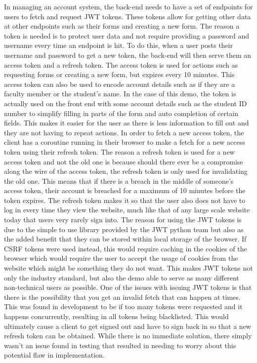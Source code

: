 In managing an account system, the back-end needs to have a set of endpoints for users to fetch and request JWT tokens. These tokens allow for getting other data at other endpoints such as their forms and creating a new form. The reason a token is needed is to protect user data and not require providing a password and username every time an endpoint is hit. To do this, when a user posts their username and password to get a new token, the back-end will then serve them an access token and a refresh token.
\newline
\newline
The access token is used for actions such as requesting forms or creating a new form, but expires every 10 minutes. This access token can also be used to encode account details such as if they are a faculty member or the student’s name. In the case of this demo, the token is actually used on the front end with some account details such as the student ID number to simplify filling in parts of the form and auto completion of certain fields. This makes it easier for the user as there is less information to fill out and they are not having to repeat actions.
\newline
\newline
In order to fetch a new access token, the client has a coroutine running in their browser to make a fetch for a new access token using their refresh token. The reason a refresh token is used for a new access token and not the old one is because should there ever be a compromise along the wire of the access token, the refresh token is only used for invalidating the old one. This means that if there is a breach in the middle of someone’s access token, their account is breached for a maximum of 10 minutes before the token expires. The refresh token makes it so that the user also does not have to log in every time they view the website, much like that of any large scale website today that users very rarely sign into.
\newline
\newline
The reason for using the JWT tokens is due to the simple to use library provided by the JWT python team but also as the added benefit that they can be stored within local storage of the browser. If CSRF tokens were used instead, this would require caching in the cookies of the browser which would require the user to accept the usage of cookies from the website which might be something they do not want. This makes JWT tokens not only the industry standard, but also the demo able to serve as many different non-technical users as possible.
\newline
\newline
One of the issues with issuing JWT tokens is that there is the possibility that you get an invalid fetch that can happen at times. This was found in development to be if too many tokens were requested and it happens concurrently, resulting in all tokens being blacklisted. This would ultimately cause a client to get signed out and have to sign back in so that a new refresh token can be obtained. While there is no immediate solution, there simply wasn’t an issue found in testing that resulted in needing to worry about this potential flaw in implementation.

